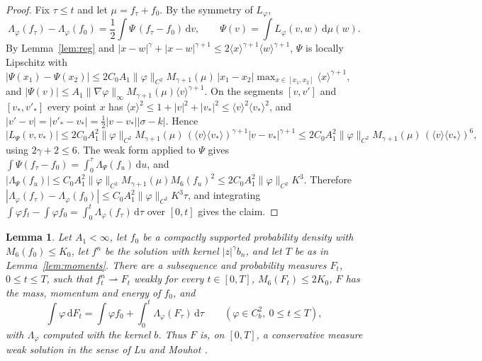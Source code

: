 \documentclass[11pt]{amsart}
\newtheorem{lemma}[theorem]{Lemma}
\theoremstyle{definition}
\newcommand{\dd}{\,\mathrm{d}}
\newcommand{\jb}[1]{\langle #1\rangle}
\begin{document}
\begin{proof}
Fix $\tau\le t$ and let $\mu=f_\tau+f_0$. By the symmetry of $L_\varphi$,
\[
\Lambda_\varphi(f_\tau)-\Lambda_\varphi(f_0)=\frac12\int\Psi\,(f_\tau-f_0)\dd v,\qquad \Psi(v)=\int L_\varphi(v,w)\dd\mu(w).
\]
By Lemma~\ref{lem:reg} and $|x-w|^\gamma+|x-w|^{\gamma+1}\le2\jb{x}^{\gamma+1}\jb{w}^{\gamma+1}$, $\Psi$ is locally Lipschitz with $|\Psi(x_1)-\Psi(x_2)|\le2C_0A_1\|\varphi\|_{C^2}M_{\gamma+1}(\mu)\,|x_1-x_2|\max_{x\in[x_1,x_2]}\jb{x}^{\gamma+1}$, and $|\Psi(v)|\le A_1\|\nabla\varphi\|_\infty M_{\gamma+1}(\mu)\jb{v}^{\gamma+1}$. On the segments $[v,v']$ and $[v_*,v'_*]$ every point $x$ has $\jb{x}^2\le1+|v|^2+|v_*|^2\le\jb{v}^2\jb{v_*}^2$, and $|v'-v|=|v'_*-v_*|=\frac12|v-v_*||\sigma-k|$. Hence
\[
|L_\Psi(v,v_*)|\le2C_0A_1^2\|\varphi\|_{C^2}M_{\gamma+1}(\mu)\,(\jb{v}\jb{v_*})^{\gamma+1}|v-v_*|^{\gamma+1}\le2C_0A_1^2\|\varphi\|_{C^2}M_{\gamma+1}(\mu)\,(\jb{v}\jb{v_*})^{6},
\]
using $2\gamma+2\le6$. The weak form applied to $\Psi$ gives $\int\Psi(f_\tau-f_0)=\int_0^\tau\Lambda_\Psi(f_u)\dd u$, and $|\Lambda_\Psi(f_u)|\le C_0A_1^2\|\varphi\|_{C^2}M_{\gamma+1}(\mu)M_6(f_u)^2\le2C_0A_1^2\|\varphi\|_{C^2}K^3$. Therefore $|\Lambda_\varphi(f_\tau)-\Lambda_\varphi(f_0)|\le C_0A_1^2\|\varphi\|_{C^2}K^3\tau$, and integrating $\int\varphi f_t-\int\varphi f_0=\int_0^t\Lambda_\varphi(f_\tau)\dd\tau$ over $[0,t]$ gives the claim.
\end{proof}

\begin{lemma}\label{lem:limit}
Let $A_1<\infty$, let $f_0$ be a compactly supported probability density with $M_6(f_0)\le K_0$, let $f^n$ be the solution with kernel $|z|^\gamma b_n$, and let $T$ be as in Lemma~\ref{lem:moments}. There are a subsequence and probability measures $F_t$, $0\le t\le T$, such that $f^n_t\rightharpoonup F_t$ weakly for every $t\in[0,T]$, $M_6(F_t)\le2K_0$, $F$ has the mass, momentum and energy of $f_0$, and
\[
\int\varphi\dd F_t=\int\varphi f_0+\int_0^t\Lambda_\varphi(F_\tau)\dd\tau\qquad(\varphi\in C^2_b,\ 0\le t\le T),
\]
with $\Lambda_\varphi$ computed with the kernel $b$. Thus $F$ is, on $[0,T]$, a conservative measure weak solution in the sense of Lu and Mouhot \cite[Definition~1.1]{LM12}.
\end{lemma}
\end{document}
